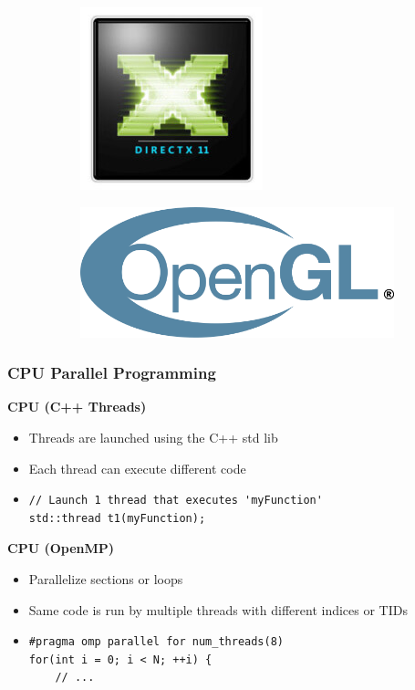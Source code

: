 \documentclass[aspectratio=169]{beamer}
\begin{document}
{\begin{figure}[!h]
\begin{subfigure}{.2\textwidth}
		\end{subfigure}
		\begin{subfigure}{.2\textwidth}
			\centering
			\includegraphics[height=.3\textheight]{d11}
		\end{subfigure}
			\begin{subfigure}{.3\textwidth}
		\centering
		\includegraphics[height=.3\textheight]{opengl}
	\end{subfigure}
	\end{figure}
}


\begin{frame} [fragile]
	\frametitle{CPU Parallel Programming}
	\textbf{CPU (C++ Threads)}
	\begin{itemize}
		\item Threads are launched using the C++ std lib
		\item Each thread can execute different code
		\item %
\begin{lstlisting} 
// Launch 1 thread that executes 'myFunction'
std::thread t1(myFunction);
\end{lstlisting}
	\end{itemize}
	\textbf{CPU (OpenMP)}
		\begin{itemize}
			\item Parallelize sections or loops
			\item Same code is run by multiple threads with different indices or TIDs
			\item %
\begin{lstlisting} 
#pragma omp parallel for num_threads(8)
for(int i = 0; i < N; ++i) {
	// ...
\end{lstlisting}
		\end{itemize}
\end{frame}
\end{document}
